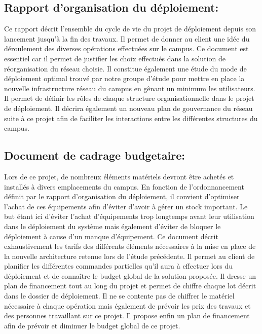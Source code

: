 \subsection{Rapport d'organisation du déploiement:} Ce rapport décrit l'ensemble du cycle de vie du projet de déploiement depuis son lancement jusqu'à la fin des travaux. Il permet de donner au client  une idée du déroulement des diverses opérations effectuées sur le campus. Ce document est essentiel car il permet de justifier les choix effectués dans la solution de réorganisation du réseau choisie. Il constitue également une étude du mode de déploiement optimal trouvé par notre groupe d'étude pour mettre en place la nouvelle infrastructure réseau du campus en gênant un minimum les utilisateurs. Il permet de définir les rôles de chaque structure organisationnelle dans le projet de déploiement. Il décrira également un nouveau plan de gouvernance du réseau suite à ce projet afin de faciliter les interactions entre les différentes structures du campus.

\subsection{Document de cadrage budgetaire:} Lors de ce projet, de nombreux éléments matériels devront être achetés et installés à divers emplacements du campus. En fonction de l'ordonnancement définit par le rapport d'organisation du déploiement, il convient d'optimiser l'achat de ces équipements afin d'éviter d'avoir à gérer un stock important. Le but étant ici d'éviter l'achat d'équipements trop longtemps avant leur utilisation dans le déploiement du système mais également d'éviter de bloquer le déploiement à cause d'un manque d'équipement. Ce document décrit exhaustivement les tarifs des différents éléments nécessaires à la mise en place de la nouvelle architecture retenue lors de l'étude précédente. Il permet au client de planifier les différentes commandes partielles qu'il aura à effectuer lors du déploiement et de connaître le budget global de la solution proposée. Il dresse un plan de financement tout au long du projet et permet de chiffre chaque lot décrit dans le dossier de déploiement. Il ne se contente pas de chiffrer le matériel nécessaire à chaque opération mais également de prévoir les prix des travaux et des personnes travaillant sur ce projet. Il propose enfin un plan de financement afin de prévoir et diminuer le budget global de ce projet.
